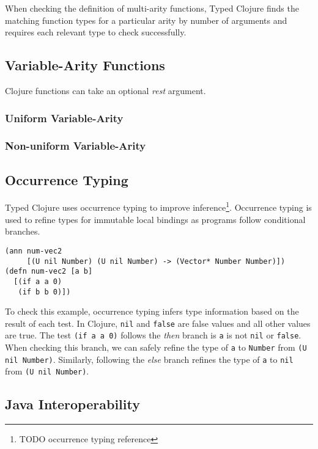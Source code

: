 When checking the definition of multi-arity functions, Typed Clojure
finds the matching function types for a particular arity by number of arguments
and requires each relevant type to check successfully.

\subsection{Variable-Arity Functions}

Clojure functions can take an optional \emph{rest} argument.

\subsubsection{Uniform Variable-Arity}

\subsubsection{Non-uniform Variable-Arity}

\subsection{Occurrence Typing}

Typed Clojure uses occurrence typing to improve inference\footnote{TODO occurrence typing reference}.
Occurrence typing is used to refine types for immutable local bindings 
as programs follow conditional branches.

\begin{lstlisting}
(ann num-vec2 
     [(U nil Number) (U nil Number) -> (Vector* Number Number)])
(defn num-vec2 [a b]
  [(if a a 0) 
   (if b b 0)])
\end{lstlisting}

To check this example, occurrence typing infers type information based on the result of each test.
In Clojure, \lstinline|nil| and \lstinline|false| are false values and all other values are true.
The test \lstinline|(if a a 0)| follows the \emph{then} branch is \lstinline|a| is not \lstinline|nil|
or \lstinline|false|. When checking this branch, we can safely refine the type of \lstinline|a| to \lstinline|Number| from
\lstinline|(U nil Number)|. Similarly, following the \emph{else} branch refines the type of \lstinline|a|
to \lstinline|nil| from \lstinline|(U nil Number)|.

\subsection{Java Interoperability}

